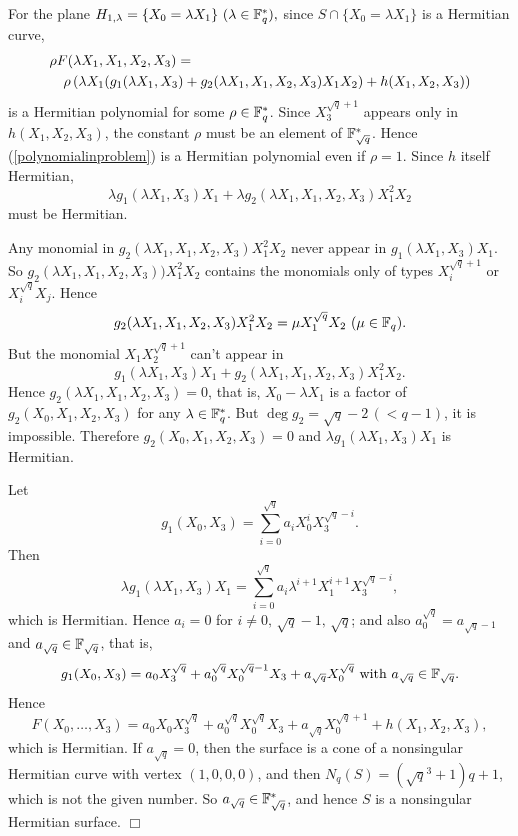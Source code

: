 \documentclass[a4paper,11pt]{article}
\newcommand{\qed}{\hfill \mbox{$  \Box $}}
\begin{document}
For the plane $H_{1, \lambda} = \{X_0 = \lambda X_1 \} \ 
(\lambda \in {\Bbb F}_q^{\ast}),$
since $S \cap \{X_0 = \lambda X_1 \}$ is a Hermitian curve,
\begin{eqnarray}
\lefteqn{ \rho F(\lambda X_1, X_1, X_2, X_3)=}\nonumber \\
&& \rho \left(
\lambda X_1 (g_1(\lambda X_1, X_3) + g_2(\lambda X_1, X_1, X_2, X_3)X_1 X_2)
  + h(X_1, X_2, X_3)
\right)
\label{polynomialinproblem}
\end{eqnarray}
is a Hermitian polynomial for some $\rho \in {\Bbb F}_q^{\ast}$.
Since $X_3^{\sqrt{q}+1}$ appears only in $h(X_1, X_2, X_3)$,
the constant $\rho$ must be an element of ${\Bbb F}_{\sqrt{q}}^{\ast}$.
Hence (\ref{polynomialinproblem}) is a Hermitian polynomial
even if $\rho =1$.
Since $h$ itself Hermitian,
\[
\lambda g_1(\lambda X_1, X_3)X_1 + 
      \lambda g_2(\lambda X_1, X_1, X_2, X_3)X_1^2 X_2
\]
must be Hermitian.

Any monomial in $g_2(\lambda X_1, X_1, X_2, X_3)X_1^2 X_2$
never appear in $g_1(\lambda X_1, X_3)X_1$.
So $g_2(\lambda X_1, X_1, X_2, X_3))X_1^2 X_2$
contains the monomials only of types $X_i^{\sqrt{q}+1}$ or $X_i^{\sqrt{q}}X_j$.
Hence
\[
 g_2(\lambda X_1, X_1, X_2, X_3)X_1^2 X_2 = \mu X_1^{\sqrt{q}} X_2
  \ (\mu \in {\Bbb F}_q).
\]
But the monomial $X_1X_2^{\sqrt{q}+1}$ can't appear in
\[
g_1(\lambda X_1, X_3)X_1 + 
       g_2(\lambda X_1, X_1, X_2, X_3)X_1^2 X_2.
\]
Hence $ g_2(\lambda X_1, X_1, X_2, X_3) =0$, that is,
$X_0 - \lambda X_1$ is a factor of $g_2(X_0, X_1, X_2, X_3)$
for any $\lambda \in {\Bbb F}_q^{\ast}$.
But $\deg g_2 = \sqrt{q}-2 \,  (< q-1)$,
it is impossible.
Therefore $g_2(X_0, X_1, X_2, X_3) =0$
and $\lambda g_1(\lambda X_1, X_3)X_1 $ is Hermitian.

Let
\[
g_1(X_0, X_3) = \sum_{i=0}^{\sqrt{q}} a_i X_0^{i}X_3^{\sqrt{q}-i}.
\]
Then
\[
\lambda g_1(\lambda X_1, X_3) X_1= 
\sum_{i=0}^{\sqrt{q}} a_i \lambda^{i+1} X_1^{i+1}X_3^{\sqrt{q}-i},
\]
which is Hermitian.
Hence $a_i = 0$ for $i \neq 0, \, \sqrt{q}-1, \, \sqrt{q}$;
and also
$a_0^{\sqrt{q}} = a_{\sqrt{q}-1}$ and $a_{\sqrt{q}} \in {\Bbb F}_{\sqrt{q}}$,
that is,
\[
g_1(X_0, X_3) = a_0 X_3^{\sqrt{q}} + a_0^{\sqrt{q}}X_0^{\sqrt{q}-1}X_3 
     + a_{\sqrt{q}}X_0^{\sqrt{q}} \ 
     \mbox{\rm with $a_{\sqrt{q}} \in {\Bbb F}_{\sqrt{q}}$}.
\]
Hence
\[
F(X_0, \dots , X_3)
= a_0 X_0 X_3^{\sqrt{q}} + a_0^{\sqrt{q}}X_0^{\sqrt{q}}X_3 
     + a_{\sqrt{q}}X_0^{\sqrt{q}+1} +h(X_1, X_2, X_3), 
\]
which is Hermitian.
If $a_{\sqrt{q}} =0$,
then the surface is a cone of a nonsingular Hermitian curve
with vertex $(1,0,0,0)$, and then
$N_q(S) = (\sqrt{q}^3 +1)q +1$, which is not the given number.
So $a_{\sqrt{q}} \in {\Bbb F}_{\sqrt{q}}^{\ast}$,
and hence $S$ is a nonsingular Hermitian surface.
\qed
\end{document}
